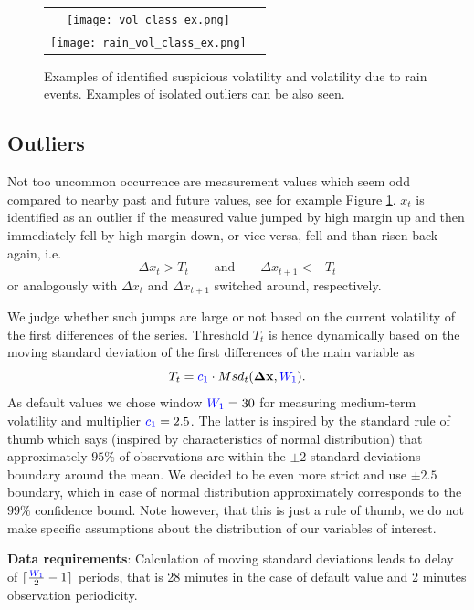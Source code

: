 \documentclass[12pt,a4paper]{article}
\begin{document}
\begin{figure}[htbp]
    \centering
    \begin{tabular}{cc}
        \texttt{[image: vol\_class\_ex.png]} \\
        \texttt{[image: rain\_vol\_class\_ex.png]} \\
    \end{tabular}
    \caption{Examples of identified suspicious volatility and volatility due to rain events. Examples of  isolated outliers can be also seen.}
    \label{fig:rain_ex}
\end{figure}

\subsection{Outliers}
Not too  uncommon occurrence are measurement values which seem odd compared to nearby past and future values, see for example Figure \ref{fig:rain_ex}. $x_t$ is identified as an outlier if the measured value jumped by high margin up and then immediately fell by high margin down, or vice versa, fell and than risen back again, i.e.
$$ \Delta x_t > T_t \qquad \text{and} \qquad \Delta x_{t+1} < -T_t $$
or analogously with $\Delta x_t$ and $\Delta x_{t+1}$ switched around, respectively.

We judge whether such jumps are large or not based on the current volatility of the first differences of the series. Threshold $T_t$ is hence dynamically based on the moving standard deviation of the first differences of the main variable as 
$$ T_t = \textcolor{blue}{c_1} \cdot Msd_t(\mathbf{\Delta x},\textcolor{blue}{W_1}). $$
As default values we chose  window $\textcolor{blue}{W_1} = 30$ for measuring medium-term volatility and multiplier  $\textcolor{blue}{c_1} = 2.5$. The latter is inspired by the standard rule of thumb which says (inspired by characteristics of normal distribution) that approximately $95\%$ of observations are within the $\pm 2$ standard deviations boundary around the mean. We decided to be even more strict and use $\pm 2.5$ boundary, which in case of normal distribution approximately corresponds to the $99\%$ confidence bound. Note however, that this is just a rule of thumb, we do not make specific assumptions about the distribution of our variables of interest. 

\textbf{Data requirements}: Calculation of moving standard deviations leads to delay of $\lceil \frac{\textcolor{blue}{W_1}}{2}-1 \rceil$ periods, that is 28 minutes in the case of default value and 2 minutes observation periodicity. 
\end{document}
